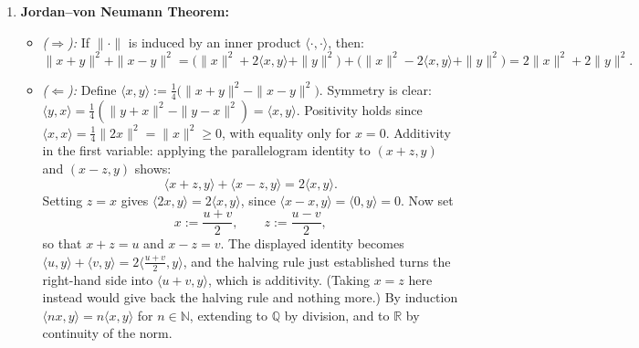 \begin{exercisesolution}
\label{sol:jordan_von_neumann_parallelogram}
\begin{enumerate}[label=\textbf{(\alph*)}]
    \item \textbf{Jordan--von Neumann Theorem:}
    \begin{itemize}
        \item \emph{($\Rightarrow$):} If $\|\cdot\|$ is induced by an inner product $\langle \cdot, \cdot \rangle$, then:
        \[
        \|x+y\|^2 + \|x-y\|^2 = \big(\|x\|^2 + 2\langle x, y \rangle + \|y\|^2\big) + \big(\|x\|^2 - 2\langle x, y \rangle + \|y\|^2\big) = 2\|x\|^2 + 2\|y\|^2.
        \]
        \item \emph{($\Leftarrow$):} Define $\langle x, y \rangle := \frac{1}{4}\big(\|x+y\|^2 - \|x-y\|^2\big)$.
        Symmetry is clear: $\langle y, x \rangle = \frac{1}{4}(\|y+x\|^2 - \|y-x\|^2) = \langle x, y \rangle$.
        Positivity holds since $\langle x, x \rangle = \frac{1}{4}\|2x\|^2 = \|x\|^2 \ge 0$, with equality only for $x = 0$.
        Additivity in the first variable: applying the parallelogram identity to $(x+z, y)$ and $(x-z, y)$ shows:
        \[
        \langle x+z, y \rangle + \langle x-z, y \rangle = 2\langle x, y \rangle.
        \]
        Setting $z = x$ gives $\langle 2x, y \rangle = 2\langle x, y \rangle$, since $\langle x - x, y \rangle = \langle 0, y \rangle = 0$. Now set
        \[
        x := \frac{u+v}{2}, \qquad z := \frac{u-v}{2},
        \]
        so that $x + z = u$ and $x - z = v$. The displayed identity becomes $\langle u, y \rangle + \langle v, y \rangle = 2\langle \frac{u+v}{2}, y \rangle$, and the halving rule just established turns the right-hand side into $\langle u+v, y \rangle$, which is additivity. (Taking $x = z$ here instead would give back the halving rule and nothing more.)
        By induction $\langle nx, y \rangle = n\langle x, y \rangle$ for $n \in \mathbb{N}$, extending to $\mathbb{Q}$ by division, and to $\mathbb{R}$ by continuity of the norm.
    \end{itemize}


\end{enumerate}
\end{exercisesolution}
